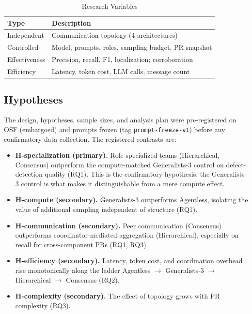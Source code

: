 \documentclass[conference]{IEEEtran}
\begin{document}
\begin{table}[t]
\caption{Research Variables}
\label{tab:vars}
\centering
\begin{tabular}{ll}
\toprule
Type & Description \\
\midrule
Independent  & Communication topology (4 architectures) \\
Controlled   & Model, prompts, roles, sampling budget, PR snapshot \\
Effectiveness& Precision, recall, F1, localization; corroboration \\
Efficiency   & Latency, token cost, LLM calls, message count \\
\bottomrule
\end{tabular}
\end{table}

\subsection{Hypotheses}
The design, hypotheses, sample sizes, and analysis plan were pre-registered
on OSF (embargoed) and prompts frozen (tag \texttt{prompt-freeze-v1}) before
any confirmatory data collection. The registered contrasts are:

\begin{itemize}
  \item \textbf{H-specialization (primary).} Role-specialized teams
  (Hierarchical, Consensus) outperform the compute-matched Generalists-3
  control on defect-detection quality (RQ1). This is the confirmatory
  hypothesis; the Generalists-3 control is what makes it distinguishable
  from a mere compute effect.
  \item \textbf{H-compute (secondary).} Generalists-3 outperforms Agentless,
  isolating the value of additional sampling independent of structure (RQ1).
  \item \textbf{H-communication (secondary).} Peer communication (Consensus)
  outperforms coordinator-mediated aggregation (Hierarchical), especially on
  recall for cross-component PRs (RQ1, RQ3).
  \item \textbf{H-efficiency (secondary).} Latency, token cost, and
  coordination overhead rise monotonically along the ladder Agentless
  $\rightarrow$ Generalists-3 $\rightarrow$ Hierarchical $\rightarrow$
  Consensus (RQ2).
  \item \textbf{H-complexity (secondary).} The effect of topology grows with
  PR complexity (RQ3).
\end{itemize}
\end{document}
